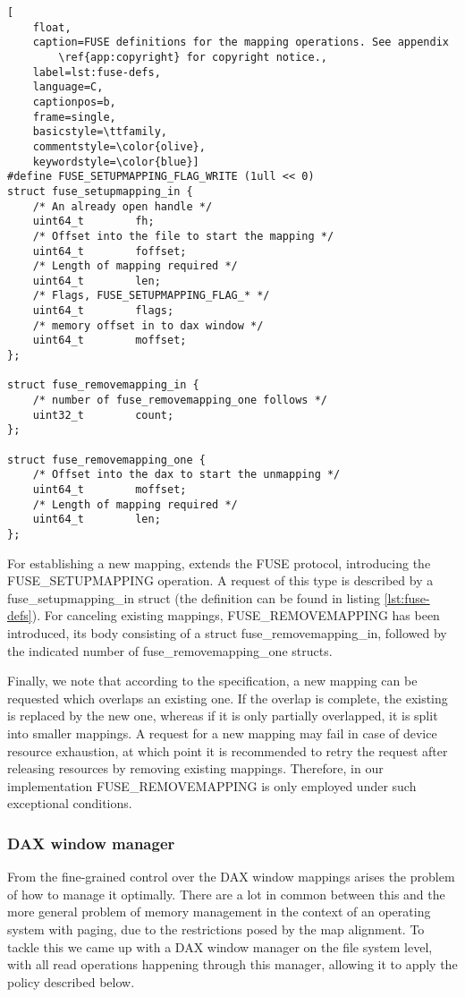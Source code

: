 \begin{lstlisting}[
    float,
    caption=FUSE definitions for the mapping operations. See appendix
        \ref{app:copyright} for copyright notice.,
    label=lst:fuse-defs,
    language=C,
    captionpos=b,
    frame=single,
    basicstyle=\ttfamily,
    commentstyle=\color{olive},
    keywordstyle=\color{blue}]
#define FUSE_SETUPMAPPING_FLAG_WRITE (1ull << 0)
struct fuse_setupmapping_in {
    /* An already open handle */
    uint64_t        fh;
    /* Offset into the file to start the mapping */
    uint64_t        foffset;
    /* Length of mapping required */
    uint64_t        len;
    /* Flags, FUSE_SETUPMAPPING_FLAG_* */
    uint64_t        flags;
    /* memory offset in to dax window */
    uint64_t        moffset;
};

struct fuse_removemapping_in {
    /* number of fuse_removemapping_one follows */
    uint32_t        count;
};

struct fuse_removemapping_one {
    /* Offset into the dax to start the unmapping */
    uint64_t        moffset;
    /* Length of mapping required */
    uint64_t        len;
};
\end{lstlisting}

For establishing a new mapping, \viofs{} extends the FUSE protocol, introducing
the FUSE\_SETUPMAPPING operation. A request of this type is described by a
fuse\_setupmapping\_in struct (the definition can be found in listing
\ref{lst:fuse-defs}). For canceling existing mappings, FUSE\_REMOVEMAPPING has
been introduced, its body consisting of a struct fuse\_removemapping\_in,
followed by the indicated number of fuse\_removemapping\_one structs.

Finally, we note that according to the specification, a new mapping can be
requested which overlaps an existing one. If the overlap is complete, the
existing is replaced by the new one, whereas if it is only partially overlapped,
it is split into smaller mappings. A request for a new mapping may fail in case
of device resource exhaustion, at which point it is recommended to retry the
request after releasing resources by removing existing mappings. Therefore, in
our implementation FUSE\_REMOVEMAPPING is only employed under such exceptional
conditions.

\subsubsection{DAX window manager}

From the fine-grained control over the DAX window mappings arises the problem
of how to manage it optimally. There are a lot in common between this and the
more general problem of memory management in the context of an operating system
with paging, due to the restrictions posed by the map alignment. To tackle this
we came up with a DAX window manager on the file system level, with all read
operations happening through this manager, allowing it to apply the policy
described below.

